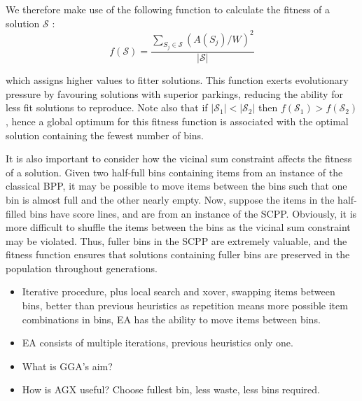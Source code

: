 \documentclass[authoryear]{elsarticle}
\begin{document}
We therefore make use of the following function to calculate the fitness of a solution $\mathcal{S}$ \citep{falkenauer1992}:
\begin{equation}
	f(\mathcal{S}) = \frac{\sum_{S_j \in \mathcal{S}} (A(S_j)/W)^2}{|\mathcal{S}|}
\end{equation}

\noindent which assigns higher values to fitter solutions. This function exerts evolutionary pressure by favouring solutions with superior parkings, reducing the ability for less fit solutions to reproduce. Note also that if $|\mathcal{S}_1| < |\mathcal{S}_2|$  then $f(\mathcal{S}_1) > f(\mathcal{S}_2)$, hence a global optimum for this fitness function is associated with the optimal solution containing the fewest number of bins.

It is also important to consider how the vicinal sum constraint affects the fitness of a solution. Given two half-full bins containing items from an instance of the classical BPP, it may be possible to move items between the bins such that one bin is almost full and the other nearly empty. Now, suppose the items in the half-filled bins have score lines, and are from an instance of the SCPP. Obviously, it is more difficult to shuffle the items between the bins as the vicinal sum constraint may be violated. Thus, fuller bins in the SCPP are extremely valuable, and the fitness function ensures that solutions containing fuller bins are preserved in the population throughout generations.

{\color{myRed}
\begin{itemize}[leftmargin=*]
	\item Iterative procedure, plus local search and xover, swapping items between bins, better than previous heuristics as repetition means more possible item combinations in bins, EA has the ability to move items between bins.
	\item EA consists of multiple iterations, previous heuristics only one.
	\item What is GGA's aim?
	\item How is AGX useful? Choose fullest bin, less waste, less bins required.
\end{itemize}
}
\end{document}
